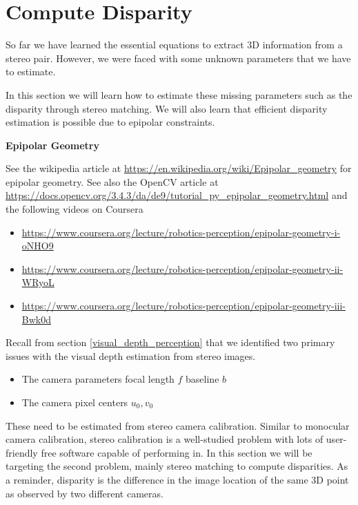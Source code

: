\section{Compute Disparity}
\label{compute_disparity}

 So far we have learned the essential equations to extract 3D information
from a stereo pair. However, we were faced with some unknown parameters that we have to estimate. 

In this section we will learn how to estimate these missing parameters such as the disparity through
stereo matching. We will also learn that efficient disparity estimation is possible due to epipolar
constraints. 

\begin{framed}
\begin{remark}{\textbf{Epipolar Geometry}}

See the wikipedia article at \url{https://en.wikipedia.org/wiki/Epipolar_geometry}
for epipolar geometry. See also the OpenCV article at \url{https://docs.opencv.org/3.4.3/da/de9/tutorial_py_epipolar_geometry.html}
and the following videos on Coursera

\begin{itemize}
\item \url{https://www.coursera.org/lecture/robotics-perception/epipolar-geometry-i-oNHO9}
\item \url{https://www.coursera.org/lecture/robotics-perception/epipolar-geometry-ii-WRyoL}
\item \url{https://www.coursera.org/lecture/robotics-perception/epipolar-geometry-iii-Bwk0d}
\end{itemize}

\end{remark}
\end{framed}


Recall from section \ref{visual_depth_perception}
that we identified two primary issues with the visual depth estimation from stereo images. 

\begin{itemize}
\item The camera parameters focal length $f$ baseline $b$ 
\item The camera pixel centers $u_0, v_0$
\end{itemize}

These need to be estimated from stereo camera calibration. Similar to monocular
camera calibration, stereo calibration is a well-studied problem with lots of user-friendly
free software capable of performing in. In this section we will be
targeting the second problem, mainly stereo matching
to compute disparities. As a reminder, disparity is the difference in
the image location of the same 3D point as observed
by two different cameras. 


